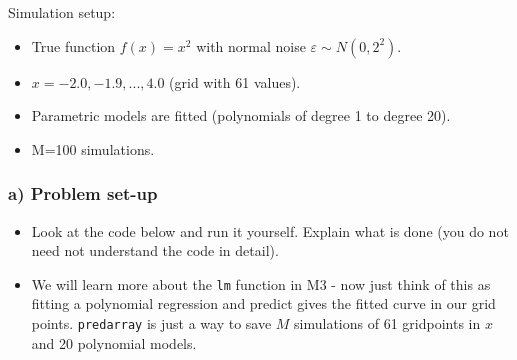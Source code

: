 \documentclass[]{article}
\providecommand{\tightlist}{%
  \setlength{\itemsep}{0pt}\setlength{\parskip}{0pt}}
\begin{document}
Simulation setup:

\begin{itemize}
\tightlist
\item
  True function \(f(x)=x^2\) with normal noise
  \(\varepsilon \sim N(0,2^2)\).
\item
  \(x= -2.0, -1.9, ... ,4.0\) (grid with 61 values).
\item
  Parametric models are fitted (polynomials of degree 1 to degree 20).
\item
  M=100 simulations.
\end{itemize}

\subsubsection{a) Problem set-up}\label{a-problem-set-up}

\begin{itemize}
\tightlist
\item
  Look at the code below and run it yourself. Explain what is done (you
  do not need not understand the code in detail).
\item
  We will learn more about the \texttt{lm} function in M3 - now just
  think of this as fitting a polynomial regression and predict gives the
  fitted curve in our grid points. \texttt{predarray} is just a way to
  save \(M\) simulations of 61 gridpoints in \(x\) and 20 polynomial
  models.
\end{itemize}
\end{document}
